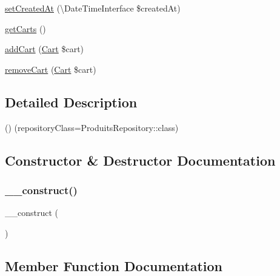 \begin{DoxyCompactItemize}
\mbox{\hyperlink{class_app_1_1_entity_1_1_produits_a2308609ef549a753223bbee71e36291e}{set\+Created\+At}} (\textbackslash{}Date\+Time\+Interface \$created\+At)
\item 
\mbox{\hyperlink{class_app_1_1_entity_1_1_produits_af01723b72fddbef7e1529591b32ac96d}{get\+Carts}} ()
\item 
\mbox{\hyperlink{class_app_1_1_entity_1_1_produits_ae6fc61e1d99695b1cd2907cf4efef430}{add\+Cart}} (\mbox{\hyperlink{class_app_1_1_entity_1_1_cart}{Cart}} \$cart)
\item 
\mbox{\hyperlink{class_app_1_1_entity_1_1_produits_a9aff9e8abf19d0390713e9ead0968f85}{remove\+Cart}} (\mbox{\hyperlink{class_app_1_1_entity_1_1_cart}{Cart}} \$cart)
\end{DoxyCompactItemize}


\subsection{Detailed Description}
() (repository\+Class=Produits\+Repository\+::class) 

\subsection{Constructor \& Destructor Documentation}
\mbox{\label{class_app_1_1_entity_1_1_produits_a095c5d389db211932136b53f25f39685}} 
\subsubsection{\texorpdfstring{\+\_\+\+\_\+construct()}{\_\_construct()}}
{\footnotesize\ttfamily \+\_\+\+\_\+construct (\begin{DoxyParamCaption}{ }\end{DoxyParamCaption})}



\subsection{Member Function Documentation}
\mbox{\label{class_app_1_1_entity_1_1_produits_ae6fc61e1d99695b1cd2907cf4efef430}} 
